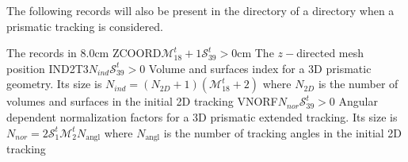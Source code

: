 The following records will also be present in the  directory of a 
directory when a prismatic tracking is considered.

\begin{DescriptionEnregistrement}{The  records in
}{8.0cm}
\OptRealEnr
  {ZCOORD}{$\mathcal{M}^{t}_{18}+1$}{$\mathcal{S}^{t}_{39} > 0$}{cm}
  {The $z-$directed mesh position}
\OptIntEnr
  {IND2T3}{$N_{ind}$}{$\mathcal{S}^{t}_{39} > 0$}
  {Volume and surfaces index for a 3D prismatic geometry. Its size is $N_{ind}=(N_{2D}+1)(\mathcal{M}^{t}_{18}+2)$ where $N_{2D}$ is the number of volumes and surfaces in the initial 2D tracking}
\OptDbleEnr
  {VNORF}{$N_{nor}$}{$\mathcal{S}^{t}_{39} > 0$}{}
  {Angular dependent normalization factors for a 3D prismatic extended tracking. Its size is $N_{nor}= 2 \mathcal{S}^{t}_{1} \mathcal{M}^{t}_{2} N_{\textrm{angl}}$ where $N_{\textrm{angl}}$ is the number of tracking angles in the initial 2D tracking}
  
\end{DescriptionEnregistrement}

\eject
